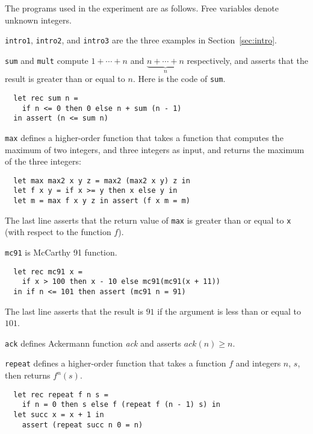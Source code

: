 The programs used in the experiment are as follows. Free variables 
denote unknown integers.
\begin{asparaitem}
\item \texttt{intro1}, \texttt{intro2}, and \texttt{intro3} are the 
three examples in Section~\ref{sec:intro}.
\item \texttt{sum} and \texttt{mult} compute \(1+\cdots+n\) and 
\(\underbrace{n+\cdots+n}_n\) respectively, and asserts that the result 
is greater than or equal to \(n\). Here is the code of \texttt{sum}.
\begin{verbatim}
  let rec sum n =
    if n <= 0 then 0 else n + sum (n - 1)
  in assert (n <= sum n)
\end{verbatim}
\item \texttt{max} defines a higher-order function that takes a function 
that computes the maximum of two integers, and three integers as input, 
and returns the maximum of the three integers:
\begin{verbatim}
  let max max2 x y z = max2 (max2 x y) z in
  let f x y = if x >= y then x else y in
  let m = max f x y z in assert (f x m = m)
\end{verbatim}
The last line asserts that the return value of \verb|max| is greater 
than or equal to \texttt{x} (with respect to the function \(f\)).
\item \texttt{mc91} is McCarthy 91 function.
\begin{verbatim}
  let rec mc91 x = 
    if x > 100 then x - 10 else mc91(mc91(x + 11)) 
  in if n <= 101 then assert (mc91 n = 91)
\end{verbatim}
The last line asserts that the result is \(91\) if the argument is less 
than or equal to \(101\).
\item \texttt{ack} defines Ackermann function \textit{ack} and asserts 
\(\textit{ack}(n)\geq n\).
\item \texttt{repeat} defines a higher-order function that takes a 
function $f$ and integers $n$, $s$, then returns $f^n(s)$.
\begin{verbatim}
  let rec repeat f n s =
    if n = 0 then s else f (repeat f (n - 1) s) in
  let succ x = x + 1 in
    assert (repeat succ n 0 = n)
\end{verbatim}


\end{asparaitem}
